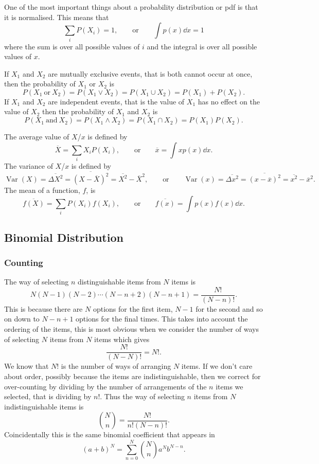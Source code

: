 \documentclass[a4paper]{article}
\newcommand{\mean}[1]{\overline{#1}}
\DeclareMathOperator{\Var}{Var}
\begin{document}
    One of the most important things about a probability distribution or \gls{pdf} is that it is normalised.
    This means that
    \[\sum_i P(X_i) = 1, \qquad\text{or}\qquad \int p(x)\dd{x} = 1\]
    where the sum is over all possible values of \(i\) and the integral is over all possible values of \(x\).
    
    If \(X_1\) and \(X_2\) are mutually exclusive events, that is both cannot occur at once, then the probability of \(X_1\) or \(X_2\) is
    \[P(X_1~\text{or}~X_2) = P(X_1\vee X_2) = P(X_1 \cup X_2) = P(X_1) + P(X_2).\]
    If \(X_1\) and \(X_2\) are independent events, that is the value of \(X_1\) has no effect on the value of \(X_2\) then the probability of \(X_1\) and \(X_2\) is
    \[P(X_1~\text{and}~X_2) = P(X_1\wedge X_2) = P(X_1 \cap X_2) = P(X_1)P(X_2).\]
    
    The average value of \(X\)/\(x\) is defined by
    \[\mean{X} = \sum_i X_iP(X_i), \qquad\text{or}\qquad \mean{x} = \int xp(x)\dd{x}.\]
    The variance of \(X\)/\(x\) is defined by
    \[\Var(X) = \mean{\Delta X^2} = \mean{(X - \mean{X})^2} = \mean{X^2} - \mean{X}^2, \qquad\text{or}\qquad \Var(x) = \mean{\Delta x^2} = \mean{(x - \mean{x})^2} = \mean{x^2} - \mean{x}^2.\]
    The mean of a function, \(f\), is
    \[\mean{f(X)} = \sum_i P(X_i)f(X_i), \qquad\text{or}\qquad \mean{f(x)} = \int p(x)f(x)\dd{x}.\]
    
    \subsection{Binomial Distribution}
    \subsubsection{Counting}
    The way of selecting \(n\) distinguishable items from \(N\) items is
    \[N(N - 1)(N - 2) \dotsm (N - n + 2)(N - n + 1) = \frac{N!}{(N - n)!}.\]
    This is because there are \(N\) options for the first item, \(N - 1\) for the second and so on down to \(N - n + 1\) options for the final times.
    This takes into account the ordering of the items, this is most obvious when we consider the number of ways of selecting \(N\) items from \(N\) items which gives
    \[\frac{N!}{(N - N)!} = N!.\]
    We know that \(N!\) is the number of ways of arranging \(N\) items.
    If we don't care about order, possibly because the items are indistinguishable, then we correct for over-counting by dividing by the number of arrangements of the \(n\) items we selected, that is dividing by \(n!\).
    Thus the way of selecting \(n\) items from \(N\) indistinguishable items is
    \[{N\choose n} = \frac{N!}{n!(N - n)!}.\]
    Coincidentally this is the same binomial coefficient that appears in
    \[(a + b)^N = \sum_{n = 0}^{N} {N\choose n}a^Nb^{N - n}.\]
    
\end{document}
